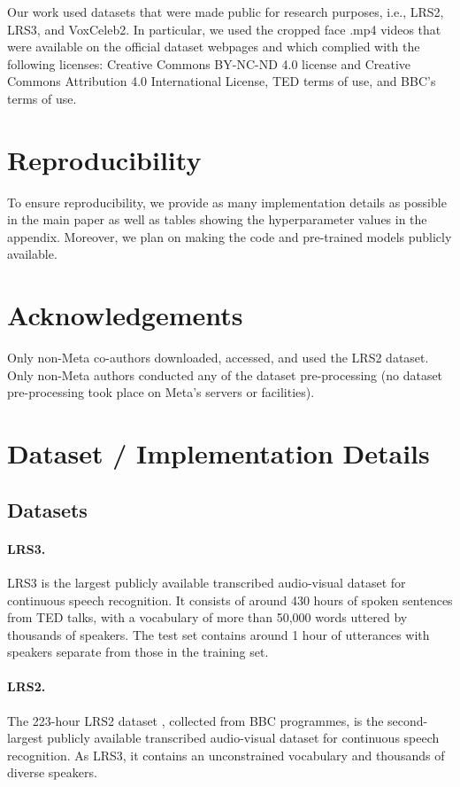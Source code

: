 \documentclass{article} \usepackage{iclr2023_conference,times}
\begin{document}
Our work used datasets that were made public for research purposes, i.e., LRS2, LRS3, and VoxCeleb2. In particular, we used the cropped face .mp4 videos that were available on the official dataset webpages and which complied with the following licenses: Creative Commons BY-NC-ND 4.0 license and Creative Commons Attribution 4.0 International License, TED terms of use, and BBC’s terms of use.

\section*{Reproducibility}
To ensure reproducibility, we provide as many implementation details as possible in the main paper as well as tables showing the hyperparameter values in the appendix. Moreover, we plan on making the code and pre-trained models publicly available.

\section*{Acknowledgements}
Only non-Meta co-authors downloaded, accessed, and used the LRS2 dataset. Only non-Meta authors conducted any of the dataset pre-processing (no dataset pre-processing took place on Meta’s servers or facilities). 




\clearpage
\appendix
\section{Dataset / Implementation Details} \label{sec:impl_details}
\subsection{Datasets}
\paragraph{LRS3.} LRS3 \citep{afouras2018lrs3} is the largest publicly available transcribed audio-visual dataset for continuous speech recognition. It consists of around 430 hours of spoken sentences from TED talks, with a vocabulary of more than 50,000 words uttered by thousands of speakers. The test set contains around 1 hour of utterances with speakers separate from those in the training set.
\paragraph{LRS2.} The 223-hour LRS2 dataset \citep{chung2017lip}, collected from BBC programmes, is the second-largest publicly available transcribed audio-visual dataset for continuous speech recognition. As LRS3, it contains an unconstrained vocabulary and thousands of diverse speakers.
\end{document}
